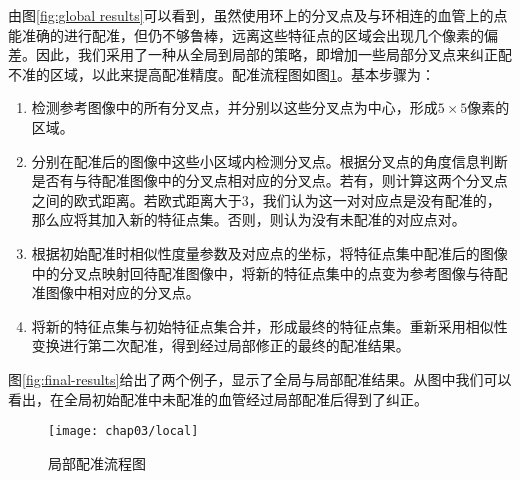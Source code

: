 由图\ref{fig:global results}可以看到，虽然使用环上的分叉点及与环相连的血管上的点能准确的进行配准，但仍不够鲁棒，远离这些特征点的区域会出现几个像素的偏差。因此，我们采用了一种从全局到局部的策略，即增加一些局部分叉点来纠正配不准的区域，以此来提高配准精度。配准流程图如图\ref{fig:local}。基本步骤为：
\begin{enumerate}
\item 检测参考图像中的所有分叉点，并分别以这些分叉点为中心，形成$5 \times 5$像素的区域。
\item 分别在配准后的图像中这些小区域内检测分叉点。根据分叉点的角度信息判断是否有与待配准图像中的分叉点相对应的分叉点。若有，则计算这两个分叉点之间的欧式距离。若欧式距离大于3，我们认为这一对对应点是没有配准的，那么应将其加入新的特征点集。否则，则认为没有未配准的对应点对。
\item 根据初始配准时相似性度量参数及对应点的坐标，将特征点集中配准后的图像中的分叉点映射回待配准图像中，将新的特征点集中的点变为参考图像与待配准图像中相对应的分叉点。
\item 将新的特征点集与初始特征点集合并，形成最终的特征点集。重新采用相似性变换进行第二次配准，得到经过局部修正的最终的配准结果。
\end{enumerate}
图\ref{fig:final-results}给出了两个例子，显示了全局与局部配准结果。从图中我们可以看出，在全局初始配准中未配准的血管经过局部配准后得到了纠正。
\begin{figure}[!ht]
  \centering
  \texttt{[image: chap03/local]}
  \caption{局部配准流程图}
  \label{fig:local}
\end{figure}

